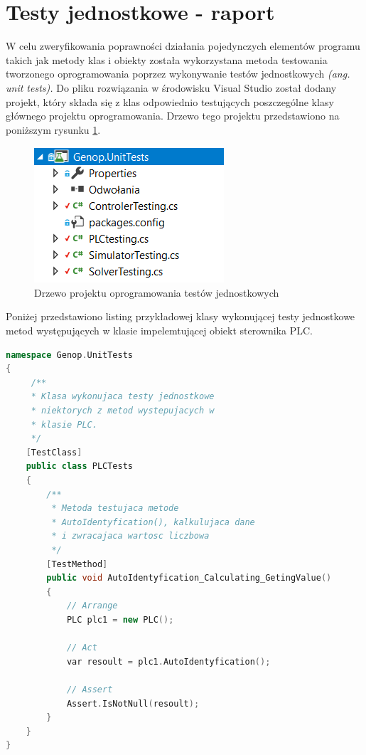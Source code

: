 \section{Testy jednostkowe - raport}

W celu zweryfikowania poprawności działania pojedynczych elementów programu takich jak metody klas i obiekty została wykorzystana metoda testowania tworzonego oprogramowania poprzez wykonywanie testów jednostkowych \textit{(ang. unit tests).}\newline
Do pliku rozwiązania w środowisku Visual Studio został dodany projekt, który składa się z klas odpowiednio testujących poszczególne klasy głównego projektu oprogramowania. Drzewo tego projektu przedstawiono na poniższym rysunku \ref{drzewo}.

\begin{figure}[ht!]
\centering
\includegraphics[scale=0.8]{listatest}
\caption{Drzewo projektu oprogramowania testów jednostkowych}
\label{drzewo}
\end{figure} 

Poniżej przedstawiono listing przykładowej klasy wykonującej testy jednostkowe metod występujących w klasie impelemtującej obiekt sterownika PLC. \newline

\begin{lstlisting}[language=C++]
namespace Genop.UnitTests
{
     /**
     * Klasa wykonujaca testy jednostkowe
     * niektorych z metod wystepujacych w
     * klasie PLC.
     */
    [TestClass]
    public class PLCTests
    {
        /**
         * Metoda testujaca metode
         * AutoIdentyfication(), kalkulujaca dane
         * i zwracajaca wartosc liczbowa
         */
        [TestMethod]
        public void AutoIdentyfication_Calculating_GetingValue()
        {
            // Arrange
            PLC plc1 = new PLC();

            // Act
            var resoult = plc1.AutoIdentyfication();

            // Assert
            Assert.IsNotNull(resoult);
        }
    }
}
\end{lstlisting}


